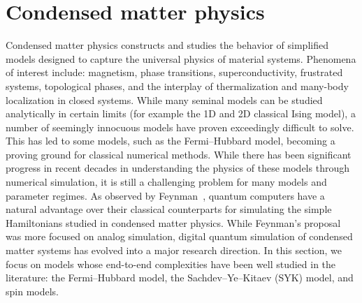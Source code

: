 


\section{Condensed matter physics }\label{appl:CondensedMatter} 

\begin{refsection}
Condensed matter physics constructs and studies the behavior of simplified models designed to capture the universal physics of material systems. Phenomena of interest include: magnetism, phase transitions, superconductivity, frustrated systems, topological phases, and the interplay of thermalization and many-body localization in closed systems. While many seminal models can be studied analytically in certain limits (for example the 1D and 2D classical Ising model), a number of seemingly innocuous models have proven exceedingly difficult to solve. This has led to some models, such as the Fermi--Hubbard model, becoming a proving ground for classical numerical methods. While there has been significant progress in recent decades in understanding the physics of these models through numerical simulation, it is still a challenging problem for many models and parameter regimes. As observed by Feynman~\cite{feynman1982SimQPhysWithComputers}, quantum computers have a natural advantage over their classical counterparts for simulating the simple Hamiltonians studied in condensed matter physics. While Feynman's proposal was more focused on analog simulation, digital quantum simulation of condensed matter systems has evolved into a major research direction. In this section, we focus on models whose end-to-end complexities have been well studied in the literature: the Fermi--Hubbard model, the Sachdev--Ye--Kitaev (SYK) model, and spin models.

\localtableofcontents
\printbibliography[heading=secbib,segment=\therefsegment]
\end{refsection}

\newpage







